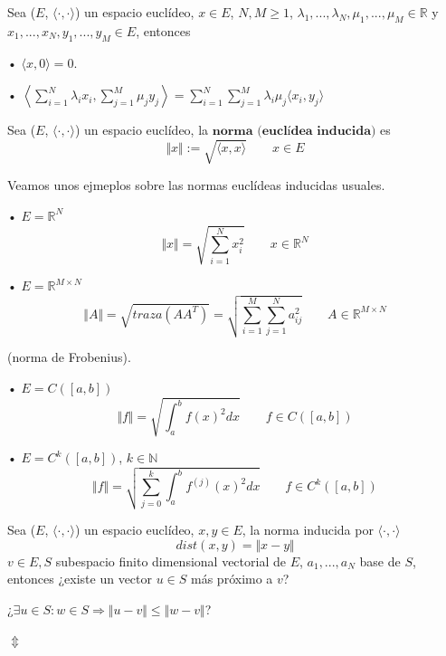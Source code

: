 \begin{nprop}
Sea ($E$, $\langle \cdot , \cdot \rangle$) un espacio euclídeo, $x \in E$, $N,M \geq 1$, $\lambda _1,...,\lambda _N, \mu _1,...,\mu _M \in \mathbb{R}$ y $x_1,...,x_N, y_1,...,y_M \in E$, entonces
	\begin{nlist}
	\item[•] $\langle x, 0 \rangle = 0$.
	\item[•] $\left\langle \sum_{i=1}^N \lambda _ix_i , \sum_{j=1}^M \mu _jy_j \right\rangle = \sum_{i=1}^N \sum_{j=1}^M \lambda _i \mu _j \langle x_i, y_j \rangle$
	\end{nlist}
\end{nprop}

\begin{nprop}
Sea ($E$, $\langle \cdot , \cdot \rangle$) un espacio euclídeo, la $\textbf{norma (euclídea inducida)}$ es 
\[ \Vert x \Vert := \sqrt{\langle x , x \rangle} \qquad x \in E\]
\end{nprop}

\begin{ejemplo}
Veamos unos ejmeplos sobre las normas euclídeas inducidas usuales.
	\begin{nlist}
	\item[•] $E = \mathbb{R}^N$
	\[ \Vert x \Vert = \sqrt{\sum_{i=1}^N x_i^2} \qquad x \in \mathbb{R}^N \]
	\item[•] $E = \mathbb{R}^{M \times N}$
	\[ \Vert A \Vert = \sqrt{traza(AA^T)} = \sqrt{ \sum_{i=1}^M \sum_{j=1}^N a_{ij}^2} \qquad A \in \mathbb{R}^{M \times N} \]
	
	(norma de Frobenius).
	\item[•] $E = C([a,b])$
	\[ \Vert f \Vert = \sqrt{\int_a^b f(x)^2 dx} \qquad f \in C([a,b]) \]
	\item[•] $E = C^k([a,b])$, $k \in \mathbb{N}$
	\[ \Vert f \Vert = \sqrt{\sum_{j=0}^k \int_a^b f^{(j)}(x)^2dx} \qquad f \in C^k([a,b])\]
	\end{nlist}
\end{ejemplo}

Sea ($E$, $\langle \cdot , \cdot \rangle$) un espacio euclídeo, $x,y \in E$, la norma inducida por $\langle \cdot , \cdot \rangle$
\[ dist(x,y) = \Vert x-y\Vert\]
$v \in E, S$ subespacio finito dimensional vectorial de $E$, {$a_1,...,a_N$} base de $S$, entonces ¿existe un vector $u \in S$ más próximo a $v$?

¿$\exists u \in S : w \in S \Rightarrow \Vert u-v \Vert \leq \Vert w-v \Vert$?

$\Updownarrow$

